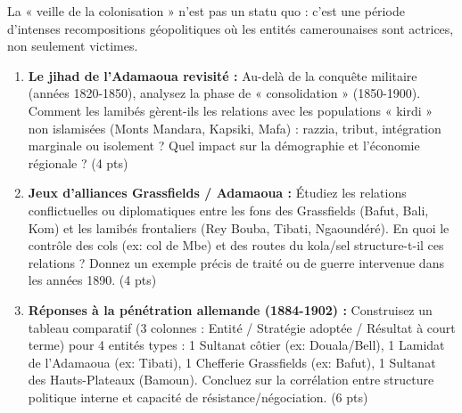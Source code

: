 \documentclass[11pt]{article}
\begin{document}
\begin{exercice}
\label{exo:dynamiques}
La « veille de la colonisation » n'est pas un statu quo : c'est une période d'intenses recompositions géopolitiques où les entités camerounaises sont actrices, non seulement victimes.

\begin{enumerate}
    \item \textbf{Le jihad de l'Adamaoua revisité :} Au-delà de la conquête militaire (années 1820-1850), analysez la phase de « consolidation » (1850-1900). Comment les lamibés gèrent-ils les relations avec les populations « kirdi » non islamisées (Monts Mandara, Kapsiki, Mafa) : razzia, tribut, intégration marginale ou isolement ? Quel impact sur la démographie et l'économie régionale ? \hfill (4 pts)
    
    \item \textbf{Jeux d'alliances Grassfields / Adamaoua :} Étudiez les relations conflictuelles ou diplomatiques entre les fons des Grassfields (Bafut, Bali, Kom) et les lamibés frontaliers (Rey Bouba, Tibati, Ngaoundéré). En quoi le contrôle des cols (ex: col de Mbe) et des routes du kola/sel structure-t-il ces relations ? Donnez un exemple précis de traité ou de guerre intervenue dans les années 1890. \hfill (4 pts)
    
    \item \textbf{Réponses à la pénétration allemande (1884-1902) :} Construisez un tableau comparatif (3 colonnes : Entité / Stratégie adoptée / Résultat à court terme) pour 4 entités types : 1 Sultanat côtier (ex: Douala/Bell), 1 Lamidat de l'Adamaoua (ex: Tibati), 1 Chefferie Grassfields (ex: Bafut), 1 Sultanat des Hauts-Plateaux (Bamoun). Concluez sur la corrélation entre structure politique interne et capacité de résistance/négociation. \hfill (6 pts)
\end{enumerate}
\end{exercice}
\end{document}
